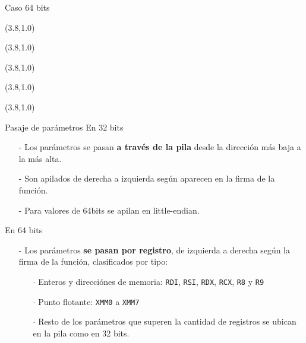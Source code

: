 \documentclass[aspectratio=169]{beamer}
\begin{document}
\begin{frame}{Caso 64 bits}
    \begin{textblock}{20}(3.8,1.0)  \end{textblock}
    \begin{textblock}{20}(3.8,1.0)  \end{textblock}
    \begin{textblock}{20}(3.8,1.0)  \end{textblock}
    \begin{textblock}{20}(3.8,1.0)  \end{textblock}
    \begin{textblock}{20}(3.8,1.0)  \end{textblock}
\end{frame}

\begin{frame}{Pasaje de parámetros}
    \textcolor{verdeuca}{En 32 bits}\\
    \begin{itemize}
    \item[-] Los parámetros se pasan \textbf{a través de la pila} desde la dirección más baja a la más alta.
    \pause
    \item[-] Son apilados de derecha a izquierda según aparecen en la firma de la función.
    \pause
    \item[-] Para valores de 64bits se apilan en little-endian.
    \end{itemize}
    \vspace{0.5cm}
    \pause
    \textcolor{verdeuca}{En 64 bits}\\
    \begin{itemize}
    \item[-] Los parámetros \textbf{se pasan por registro}, de izquierda a derecha según la firma de la función, clasificados por tipo:
    \pause
    \begin{itemize}
    \item[$\cdot$] Enteros y direcciónes de memoria: \texttt{RDI}, \texttt{RSI}, \texttt{RDX}, \texttt{RCX}, \texttt{R8} y \texttt{R9}
    \pause
    \item[$\cdot$] Punto flotante: \texttt{XMM0} a \texttt{XMM7}
    \pause
    \item[$\cdot$] Resto de los parámetros que superen la cantidad de registros se ubican en la pila como en 32 bits.
    \end{itemize}
    \end{itemize}
\end{frame}
\end{document}
